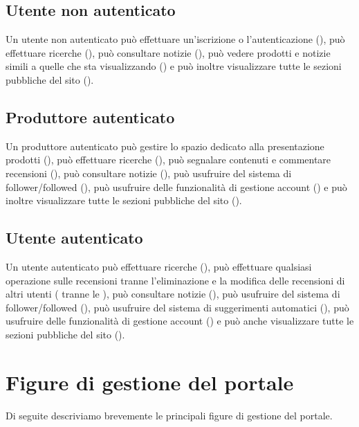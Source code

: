 \subsection{Utente non autenticato}
Un utente non autenticato può effettuare un’iscrizione o l’autenticazione (), può effettuare ricerche (), può consultare notizie (), può vedere prodotti e notizie simili a quelle che sta visualizzando () e può inoltre visualizzare tutte le sezioni pubbliche del sito ().

\subsection{Produttore autenticato}
Un produttore autenticato può gestire lo spazio dedicato alla presentazione prodotti (), può effettuare ricerche (), può segnalare contenuti e commentare recensioni (), può consultare notizie (), può usufruire del sistema di follower/followed (), può usufruire delle funzionalità di gestione account () e può inoltre visualizzare tutte le sezioni pubbliche del sito ().

\subsection{Utente autenticato}
Un utente autenticato può effettuare ricerche (), può effettuare qualsiasi operazione sulle recensioni tranne l’eliminazione e la modifica delle recensioni di altri utenti ( tranne le ),  può consultare notizie (), può usufruire del sistema di follower/followed  (), può usufruire del sistema di suggerimenti automatici  (), può usufruire delle funzionalità di gestione account () e può anche visualizzare tutte le sezioni pubbliche del sito  ().

\section{Figure di gestione del portale}
Di seguite descriviamo brevemente le principali figure di gestione del portale.

